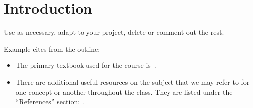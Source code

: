\documentclass{easychair}
\newcommand{\easychair}{\sf{easychair}}
\begin{document}
\maketitle

%
\begin{abstract}
In order to ease the lives of authors, editors, and trees, we present an
easy-to-read guide to the easy-to-use {\easychair} {\LaTeX2e} document style
class for EasyChair-based electronic and on-paper publishing of workshop and conference
proceedings.
\end{abstract}


\section{Introduction}
\label{sect:introduction}

Use as necessary, adapt to your project, delete or comment out the rest.

Example cites from the outline:
%
\begin{itemize}
	\item 
The primary textbook used
for the course is~\cite{boismenu-inse691e-f2012}.
	\item 
There are additional useful resources on the subject that we may refer to for one concept
or another throughout the class. They are listed under the ``References'' section:
\cite{%
win-net-forensics-investigation-2012,%
understand-caf-for-success-investigation,%
craigball,%
know-your-enemy-2004,%
incident-response-comp-forensics-2004,%
helix-forensic-toolkit,%
sleuthkit,%
forensics-tasks,%
forensic-memory-analysis-07,%
forensic-log-analysis-07,%
forensic-email-analysis-09,%
gladyshev-phd-2004,%
printer-case,%
blackmail-case,%
debbabi-inse6150-2006-formal-analysis,%
debbabi-inse6120-2005,%
mokhov-phd-thesis-2013,%
mac-spoofer-analyzer-detail-fps2014,%
ftklipse,ftklipse-srs,ftklipse-sdd%
}.
\end{itemize}
\end{document}
